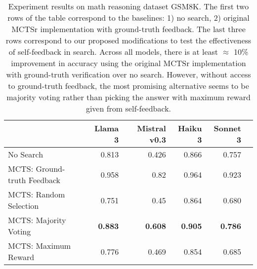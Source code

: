 \begin{table*}[t] %
    \centering %
    \begin{tabular}{lrrrrr}
        \toprule %
        & Llama 3 & Mistral v0.3 & Haiku 3  & Sonnet 3 \\
        \midrule %
        No Search & 0.813 & 0.426 & 0.866  & 0.757 \\
        MCTS: Ground-truth Feedback &  0.958  &  0.82  & 0.964  &  0.923  \\
        \midrule
        MCTS: Random Selection & 0.751 & 0.45  & 0.864 &  0.680 \\
        MCTS: Majority Voting & \textbf{0.883}  & \textbf{0.608} & \textbf{0.905}  & \textbf{0.786} \\
        MCTS: Maximum Reward & 0.776 & 0.469 & 0.854 & 0.685 \\
        \bottomrule %
    \end{tabular}
    \caption{Experiment results on math reasoning dataset GSM8K. The first two rows of the table correspond to the baselines: 1) no search, 2) original MCTSr implementation with ground-truth feedback. The last three rows correspond to our proposed modifications to test the effectiveness of self-feedback in search. Across all models, there is at least $\approx$ 10\% improvement in accuracy using the original MCTSr implementation with ground-truth verification over no search. However, without access to ground-truth feedback, the most promising alternative seems to be majority voting rather than picking the answer with maximum reward given from self-feedback.}
    \label{table:unrealistic}
\end{table*}